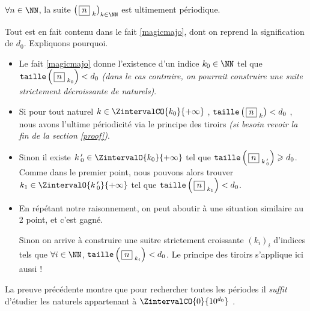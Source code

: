 \medskip

\begin{fact}\label{beautifulproof}
	$\forall n \in \NN$, la suite $\left( \, \sqseq{n}{k} \right)_{k \in \NN}$ est ultimement périodique.
\end{fact}

\begin{proof*}
	Tout est en fait contenu dans le fait \ref{magicmajo}, dont on reprend la signification de $d_0$. Expliquons pourquoi.
	\begin{itemize}[label = \textbullet]
		\item Le fait \ref{magicmajo} donne l'existence d'un indice $k_0 \in \NN$ tel que $\operatorname{\text{\normalfont\texttt{taille}}}\left( \, \fbox{$n$}_{\,\,k_0} \right) < d_0$ \emph{(dans le cas contraire, on pourrait construire une suite strictement décroissante de naturels)}.

		\item Si pour tout naturel $k \in \ZintervalCO{k_0}{+\infty}$ , $\operatorname{\text{\normalfont\texttt{taille}}}\left( \, \fbox{$n$}_{\,\,k} \right) < d_0$ , nous avons l'ultime périodicité via le principe des tiroirs \emph{(si besoin revoir la fin de la section \ref{proof})}.

		\item Sinon il existe $k\,^\prime_0 \in \ZintervalO{k_0}{+\infty}$ tel que $\operatorname{\text{\normalfont\texttt{taille}}}\left( \, \fbox{$n$}_{\,\,k\,^\prime_0} \right) \geqslant d_0$. Comme dans le premier point, nous pouvons alors trouver $k_1 \in \ZintervalO{k\,^\prime_0}{+\infty}$ tel que $\operatorname{\text{\normalfont\texttt{taille}}}\left( \, \fbox{$n$}_{\,\,k_1} \right) < d_0$.
		
		\item En répétant notre raisonnement,
		on peut aboutir à une situation similaire au 2\ieme{} point, et c'est gagné. 
		
		\noindent
		Sinon on arrive à construire une suitre strictement croissante $\left( k_i \right)_i$ d'indices tels que $\forall i \in \NN$, $\operatorname{\text{\normalfont\texttt{taille}}}\left( \, \fbox{$n$}_{\,\,k_i} \right) < d_0$. Le principe des tiroirs s'applique ici aussi !
	\end{itemize}
\end{proof*}



\medskip

\begin{remark}
	La preuve précédente montre que pour rechercher toutes les périodes il \emph{\og suffit \fg} d'étudier les naturels appartenant à $\ZintervalCO{0}{10^{d_0}}$ .
\end{remark}
